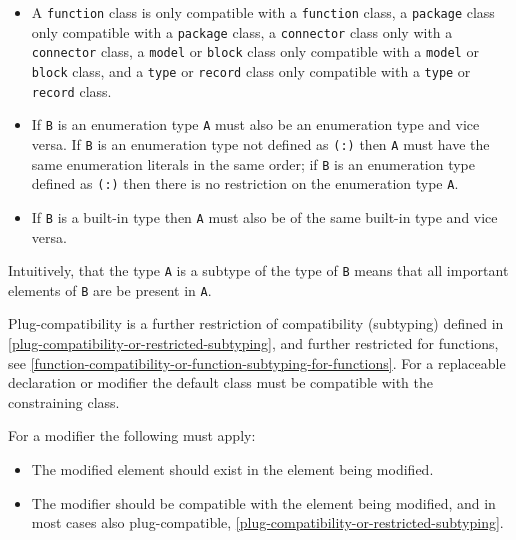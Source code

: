 \begin{itemize}
\begin{itemize}
    Conditional components are only compatible with conditional components.
    The conditions must have equivalent contents (similar to array sizes, except there is no \lstinline!:! for conditional components).
    \begin{nonnormative}
    For a redeclaration of an element the conditional part is inherited from the original.
    \end{nonnormative}
  \item
    A \lstinline!function! class is only compatible with a \lstinline!function! class, a \lstinline!package! class only compatible with a \lstinline!package! class, a \lstinline!connector! class only with a \lstinline!connector! class, a \lstinline!model! or \lstinline!block! class only compatible with a \lstinline!model! or \lstinline!block! class, and a \lstinline!type! or \lstinline!record! class only compatible with a \lstinline!type! or \lstinline!record! class.
  \item
    If \lstinline!B! is an enumeration type \lstinline!A! must also be an enumeration type and vice versa.
    If \lstinline!B! is an enumeration type not defined as \lstinline!(:)! then \lstinline!A! must have the same enumeration literals in the same order; if \lstinline!B! is an enumeration type defined as \lstinline!(:)! then there is no restriction on the enumeration type \lstinline!A!.
  \item
    If \lstinline!B! is a built-in type then \lstinline!A! must also be of the same built-in type and vice versa.
  \end{itemize}
\end{itemize}

\begin{nonnormative}
Intuitively, that the type \lstinline!A! is a subtype of the type of \lstinline!B! means that all important elements of \lstinline!B! are be present in \lstinline!A!.
\end{nonnormative}

Plug-compatibility is a further restriction of compatibility (subtyping) defined in \cref{plug-compatibility-or-restricted-subtyping}, and further restricted for functions, see \cref{function-compatibility-or-function-subtyping-for-functions}.
For a replaceable declaration or modifier the default class must be compatible with the constraining class.

For a modifier the following must apply:
\begin{itemize}
\item
  The modified element should exist in the element being modified.
\item
  The modifier should be compatible with the element being modified, and in most cases also plug-compatible, \cref{plug-compatibility-or-restricted-subtyping}.
\end{itemize}

